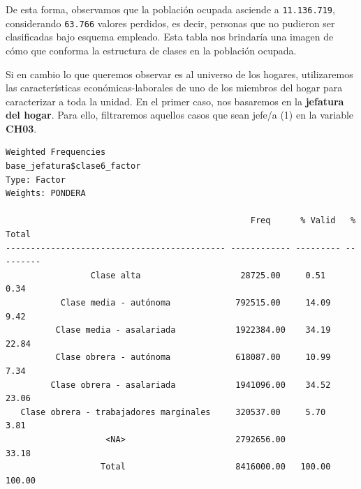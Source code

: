 \documentclass[
]{article}
\newenvironment{Shaded}{\begin{snugshade}}{\end{snugshade}}
\newcommand{\AttributeTok}[1]{\textcolor[rgb]{0.13,0.29,0.53}{#1}}
\newcommand{\CommentTok}[1]{\textcolor[rgb]{0.56,0.35,0.01}{\textit{#1}}}
\newcommand{\ConstantTok}[1]{\textcolor[rgb]{0.56,0.35,0.01}{#1}}
\newcommand{\DecValTok}[1]{\textcolor[rgb]{0.00,0.00,0.81}{#1}}
\newcommand{\FunctionTok}[1]{\textcolor[rgb]{0.13,0.29,0.53}{\textbf{#1}}}
\newcommand{\NormalTok}[1]{#1}
\newcommand{\OtherTok}[1]{\textcolor[rgb]{0.56,0.35,0.01}{#1}}
\newcommand{\SpecialCharTok}[1]{\textcolor[rgb]{0.81,0.36,0.00}{\textbf{#1}}}
\newcommand{\StringTok}[1]{\textcolor[rgb]{0.31,0.60,0.02}{#1}}
\begin{document}
De esta forma, observamos que la población ocupada asciende a \texttt{11.136.719}, considerando \texttt{63.766} valores perdidos, es decir, personas que no pudieron ser clasificadas bajo esquema empleado. Esta tabla nos brindaría una imagen de cómo que conforma la estructura de clases en la población ocupada.

Si en cambio lo que queremos observar es al universo de los hogares, utilizaremos las características económicas-laborales de uno de los miembros del hogar para caracterizar a toda la unidad. En el primer caso, nos basaremos en la \textbf{jefatura del hogar}. Para ello, filtraremos aquellos casos que sean jefe/a (1) en la variable \textbf{CH03}.

\begin{Shaded}
\end{Shaded}

\begin{verbatim}
Weighted Frequencies  
base_jefatura$clase6_factor  
Type: Factor  
Weights: PONDERA  

                                                 Freq      % Valid   % Total 
-------------------------------------------- ------------ --------- ---------
                 Clase alta                    28725.00     0.51      0.34   
           Clase media - autónoma             792515.00     14.09     9.42   
          Clase media - asalariada            1922384.00    34.19     22.84  
          Clase obrera - autónoma             618087.00     10.99     7.34   
         Clase obrera - asalariada            1941096.00    34.52     23.06  
   Clase obrera - trabajadores marginales     320537.00     5.70      3.81   
                    <NA>                      2792656.00              33.18  
                   Total                      8416000.00   100.00    100.00  
\end{verbatim}
\end{document}
